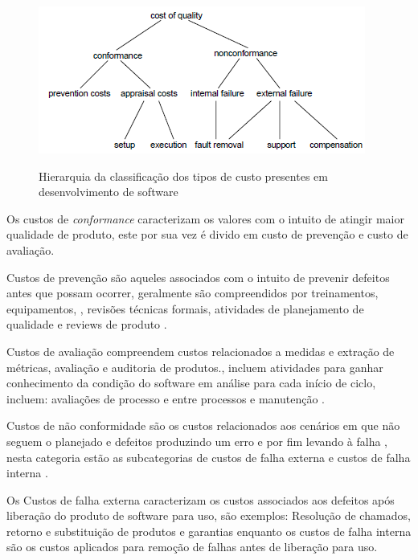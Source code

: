 \documentclass[
	12pt,				%
	oneside,			%
	a4paper,			%
	english,			%
	brazil				%
	]{abntex2ppgsi}
\begin{document}
\begin{figure}[H]%
	\centering
 	  \caption{Hierarquia da classificação dos tipos de custo presentes em desenvolvimento de software}
		\includegraphics{tipos-custo-arvore.png}
	\label{fig:tipos-custo-arvore}
\end{figure}

Os custos de \textit{conformance} caracterizam os valores com o intuito de atingir maior qualidade de produto, este por sua vez é divido em custo de prevenção e custo de avaliação. \cite{ wagner2005}

Custos de prevenção são aqueles associados com o intuito de prevenir defeitos antes que possam ocorrer, geralmente são compreendidos por treinamentos, equipamentos, , revisões técnicas formais, atividades de planejamento de qualidade e reviews de produto \cite{wagner2005} \cite{pressman2009engenharia}.

Custos de avaliação compreendem custos relacionados a medidas e extração de métricas, avaliação e auditoria de produtos.\cite{wagner2005}, incluem atividades para ganhar conhecimento da condição do software em análise para cada início de ciclo, incluem: avaliações de processo e entre processos e manutenção \cite{pressman2009engenharia}.

Custos de não conformidade são os custos relacionados aos cenários em que não seguem o planejado e defeitos produzindo um erro e por fim levando à falha \cite{wagner2005}, nesta categoria estão as subcategorias de custos de falha externa e custos de falha interna \cite{pressman2009engenharia}. 

Os Custos de falha externa caracterizam os custos associados aos defeitos após liberação do produto de software para uso, são exemplos: Resolução de chamados, retorno e substituição de produtos e garantias \cite{pressman2009engenharia} enquanto os custos de falha interna são os custos aplicados para remoção de falhas antes de liberação para uso.
\end{document}

